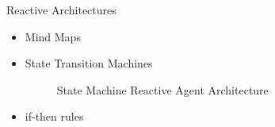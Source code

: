 \documentclass{report}
\begin{document}
\begin{description} %
	\item Reactive Architectures
	\begin{itemize}
		\item Mind Maps
		\item State Transition Machines %

		\begin{figure}[tp]
		\setlength\fboxsep{0pt}
		\setlength\fboxrule{0.5pt}
		\caption{State Machine Reactive Agent Architecture}
		\label{fig:SimTL}
		\end{figure}

		\item if-then rules
	\end{itemize}
	

\end{description}
\end{document}
